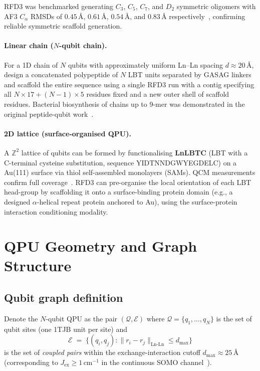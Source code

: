 \documentclass[11pt,oneside]{amsbook}
\numberwithin{equation}{section}
\theoremstyle{plain}
\theoremstyle{definition}
\theoremstyle{remark}
\begin{document}
RFD3 was benchmarked generating $C_3$, $C_5$, $C_7$, and $D_2$ symmetric
oligomers with AF3 $C_\alpha$ RMSDs of $0.45\,\text{\AA}$, $0.61\,\text{\AA}$,
$0.54\,\text{\AA}$, and $0.83\,\text{\AA}$ respectively~\cite{ButcherEtAl2025},
confirming reliable symmetric scaffold generation.

\paragraph{Linear chain ($N$-qubit chain).}
For a 1D chain of $N$ qubits with approximately uniform Ln--Ln spacing
$d \approx 20$\,\AA, design a concatenated polypeptide of $N$ LBT units
separated by GASAG linkers and scaffold the entire sequence using a single
RFD3 run with a contig specifying all $N \times 17 + (N-1) \times 5$ residues
fixed and a new outer shell of scaffold residues.  Bacterial biosynthesis of
chains up to 9-mer was demonstrated in the original peptide-qubit
work~\cite{RosalenyEtAl2017}.

\paragraph{2D lattice (surface-organised QPU).}
A $\mathbb{Z}^2$ lattice of qubits can be formed by functionalising
\textbf{LnLBTC} (LBT with a C-terminal cysteine substitution,
sequence YIDTNNDGWYEGDELC) on a Au(111) surface via thiol self-assembled
monolayers (SAMs).  QCM measurements confirm full coverage~\cite{RosalenyEtAl2017}.
RFD3 can pre-organise the local orientation of each LBT head-group by
scaffolding it onto a surface-binding protein domain (e.g., a designed
$\alpha$-helical repeat protein anchored to Au), using the surface-protein
interaction conditioning modality.

\section{QPU Geometry and Graph Structure}
\label{sec:pqpu_geometry}

\subsection{Qubit graph definition}
\label{subsec:pqpu_graph}

Denote the $N$-qubit QPU as the pair $(\mathcal{Q}, \mathcal{E})$ where
$\mathcal{Q} = \{q_1, \ldots, q_N\}$ is the set of qubit sites (one 1TJB unit
per site) and
\[
  \mathcal{E} \;=\; \{(q_i, q_j) : \|r_i - r_j\|_{\text{Ln-Ln}} \le d_{\text{max}}\}
\]
is the set of \emph{coupled pairs} within the exchange-interaction cutoff
$d_{\text{max}} \approx 25\,\text{\AA}$ (corresponding to $J_{\text{ex}} \ge 1\,\text{cm}^{-1}$
in the continuous SOMO channel~\cite{RosalenyEtAl2017}).
\end{document}

